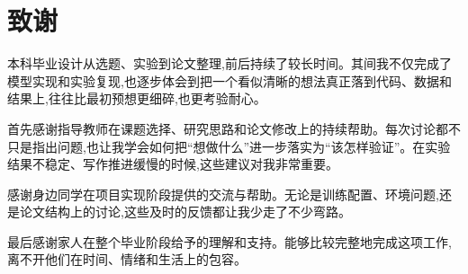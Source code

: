 \chapter*{致谢}

本科毕业设计从选题、实验到论文整理,前后持续了较长时间。其间我不仅完成了模型实现和实验复现,也逐步体会到把一个看似清晰的想法真正落到代码、数据和结果上,往往比最初预想更细碎,也更考验耐心。

首先感谢指导教师在课题选择、研究思路和论文修改上的持续帮助。每次讨论都不只是指出问题,也让我学会如何把“想做什么”进一步落实为“该怎样验证”。在实验结果不稳定、写作推进缓慢的时候,这些建议对我非常重要。

感谢身边同学在项目实现阶段提供的交流与帮助。无论是训练配置、环境问题,还是论文结构上的讨论,这些及时的反馈都让我少走了不少弯路。

最后感谢家人在整个毕业阶段给予的理解和支持。能够比较完整地完成这项工作,离不开他们在时间、情绪和生活上的包容。
